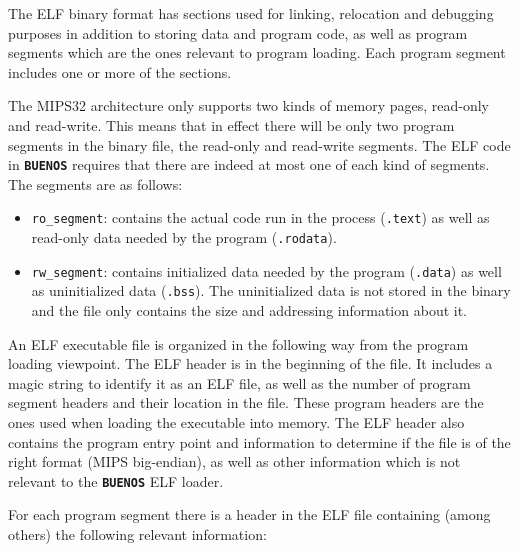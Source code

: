 \documentclass[twoside,a4paper]{report}
\newcommand{\buenos}{\texttt{\textbf{BUENOS}}}
\begin{document}
The ELF binary format has sections used for linking, relocation and
debugging purposes in addition to storing data and program code, as
well as program segments which are the ones relevant to program
loading. Each program segment includes one or more of the sections.

The MIPS32 architecture only supports two kinds of memory pages,
read-only and read-write. This means that in effect there will be only
two program segments in the binary file, the read-only and read-write
segments. The ELF code in \buenos{} requires that there are indeed at
most one of each kind of segments. The segments are as follows:

\begin{itemize}
\item \texttt{ro\_segment}:  contains the
  actual code run in the process (\texttt{.text}) as well as read-only
  data needed by the program (\texttt{.rodata}).

\item \texttt{rw\_segment}:  contains
  initialized data needed by the program (\texttt{.data}) as well as
  uninitialized data (\texttt{.bss}). The uninitialized data is not
  stored in the binary and the file only contains the size and
  addressing information about it.
\end{itemize}

An ELF executable file is organized in the following way from the
program loading viewpoint. The ELF header is in the beginning of the
file. It includes a magic string to identify it as an ELF file, as
well as the number of program segment headers and their location in
the file. These program headers are the ones used when loading the
executable into memory. The ELF header also contains the program entry
point   and information
to determine if the file is of the right format (MIPS big-endian), as
well as other information which is not relevant to the \buenos{} ELF
loader.

For each program segment there is a header in the ELF file containing
(among others) the following relevant information:
\end{document}
